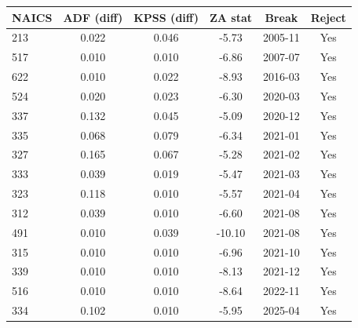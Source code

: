 {\footnotesize
\begin{tabular}{lccccc}
\toprule
NAICS & ADF (diff) & KPSS (diff) & ZA stat & Break & Reject \\
\midrule
213 & 0.022 & 0.046 & -5.73 & 2005-11 & Yes \\
517 & 0.010 & 0.010 & -6.86 & 2007-07 & Yes \\
622 & 0.010 & 0.022 & -8.93 & 2016-03 & Yes \\
524 & 0.020 & 0.023 & -6.30 & 2020-03 & Yes \\
337 & 0.132 & 0.045 & -5.09 & 2020-12 & Yes \\
335 & 0.068 & 0.079 & -6.34 & 2021-01 & Yes \\
327 & 0.165 & 0.067 & -5.28 & 2021-02 & Yes \\
333 & 0.039 & 0.019 & -5.47 & 2021-03 & Yes \\
323 & 0.118 & 0.010 & -5.57 & 2021-04 & Yes \\
312 & 0.039 & 0.010 & -6.60 & 2021-08 & Yes \\
491 & 0.010 & 0.039 & -10.10 & 2021-08 & Yes \\
315 & 0.010 & 0.010 & -6.96 & 2021-10 & Yes \\
339 & 0.010 & 0.010 & -8.13 & 2021-12 & Yes \\
516 & 0.010 & 0.010 & -8.64 & 2022-11 & Yes \\
334 & 0.102 & 0.010 & -5.95 & 2025-04 & Yes \\
\bottomrule
\end{tabular}
}
